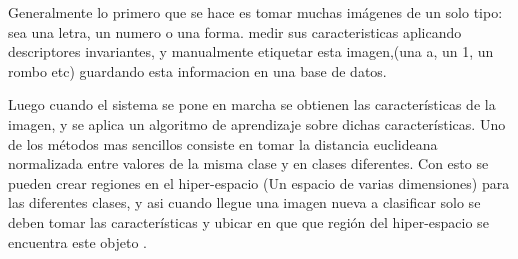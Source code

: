 \documentclass{article}
\begin{document}
	Generalmente lo primero que se hace es tomar muchas imágenes de un solo tipo: sea una letra, un 
	numero o una forma. medir sus caracteristicas aplicando
	descriptores invariantes, y manualmente etiquetar esta imagen,(una a, un 1, un rombo etc) 
	guardando esta informacion en una base de datos. 
	
	Luego cuando el sistema se pone en marcha se obtienen las características de la imagen, y se
	aplica un algoritmo de aprendizaje sobre dichas características. Uno de los métodos mas
	sencillos consiste en tomar la distancia euclideana normalizada entre valores de la misma
	clase y en clases diferentes. Con esto se pueden crear regiones en el hiper-espacio (Un
	espacio de varias dimensiones) para las diferentes clases, y asi cuando llegue una imagen
	nueva a clasificar solo se deben tomar las características y ubicar en que que región del
	hiper-espacio se encuentra este objeto \cite{learn1}.
		
	
\end{document}

